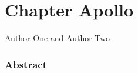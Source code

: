 \chapter[Apollo chapter entry for ToC]{Chapter Apollo}

\hyphenation{}

{\large\color{eurgreen} Author One and Author Two}
\emptyline
\emptyline
\emptyline


\subsection*{Abstract}
\blindtext
\clearpage

\blindmathpaper
